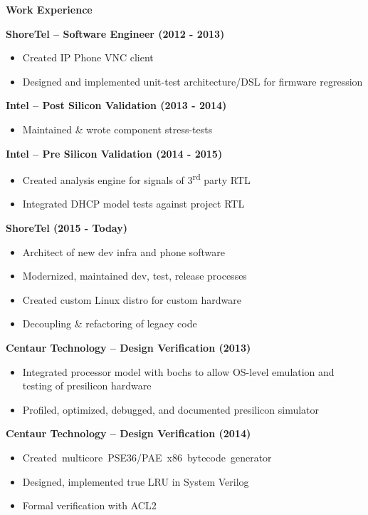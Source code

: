 \documentclass{report}
\begin{document}
\textbf{Work Experience} \\
\begin{paracol}{2}
  \textbf{ShoreTel -- Software Engineer (2012 - 2013)}
  \begin{itemize}[label=$\circ$]
  \item Created IP Phone VNC client
  \item Designed and implemented unit-test architecture/DSL for firmware regression
  \end{itemize}

  \textbf{Intel -- Post Silicon Validation (2013 - 2014)}
  \begin{itemize}[label=$\circ$]
  \item Maintained \& wrote component stress-tests
  \end{itemize}

  \textbf{Intel -- Pre Silicon Validation (2014 - 2015)}
  \begin{itemize}[label=$\circ$]
  \item Created analysis engine for signals of 3\textsuperscript{rd} party RTL
  \item Integrated DHCP model tests against project RTL
  \end{itemize}

  \textbf{ShoreTel (2015 - Today)}
  \begin{itemize}[label=$\circ$]
  \item Architect of new dev infra and phone software
  \item Modernized, maintained dev, test, release processes
  \item Created custom Linux distro for custom hardware
  \item Decoupling \& refactoring of legacy code
  \end{itemize}

  \switchcolumn{}
  \textbf{Centaur Technology -- Design Verification (2013)}
  \begin{itemize}[label=$\circ$]
  \item Integrated processor model with bochs to allow OS-level
    emulation and testing of presilicon hardware
  \item Profiled, optimized, debugged, and documented presilicon simulator
  \end{itemize}

  \textbf{Centaur Technology -- Design Verification (2014)}
  \begin{itemize}[label=$\circ$]
  \item \mbox{Created multicore PSE36/PAE x86 bytecode generator}
  \item Designed, implemented true LRU in System Verilog
  \item Formal verification with ACL2
  \end{itemize}


\end{paracol}
\end{document}
